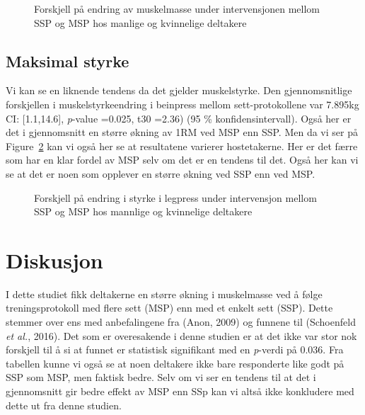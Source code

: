 \documentclass[
  letterpaper,
  DIV=11,
  numbers=noendperiod]{scrreprt}
\begin{document}
\begin{figure}


\caption{\label{fig-lean-body-mass}Forskjell på endring av muskelmasse
under intervensjonen mellom SSP og MSP hos manlige og kvinnelige
deltakere}

\end{figure}%

\subsection{Maksimal styrke}\label{maksimal-styrke}

Vi kan se en liknende tendens da det gjelder muskelstyrke. Den
gjennomsnitlige forskjellen i muskelstyrkeendring i beinpress mellom
sett-protokollene var 7.895kg CI: {[}1.1,14.6{]}, \emph{p}-value =0.025,
t30 =2.36) (95 \% konfidensintervall). Også her er det i gjennomsnitt en
større økning av 1RM ved MSP enn SSP. Men da vi ser på
Figure~\ref{fig-strength-test} kan vi også her se at resultatene
varierer hostetakerne. Her er det færre som har en klar fordel av MSP
selv om det er en tendens til det. Også her kan vi se at det er noen som
opplever en større økning ved SSP enn ved MSP.

\begin{figure}


\caption{\label{fig-strength-test}Forskjell på endring i styrke i
legpress under intervensjon mellom SSP og MSP hos mannlige og kvinnelige
deltakere}

\end{figure}%

\section{Diskusjon}\label{diskusjon-2}

I dette studiet fikk deltakerne en større økning i muskelmasse ved å
følge treningsprotokoll med flere sett (MSP) enn med et enkelt sett
(SSP). Dette stemmer over ens med anbefalingene fra (Anon, 2009) og
funnene til (Schoenfeld \emph{et al.}, 2016). Det som er overesakende i
denne studien er at det ikke var stor nok forskjell til å si at funnet
er statistisk signifikant med en \emph{p}-verdi på 0.036. Fra tabellen
kunne vi også se at noen deltakere ikke bare responderte like godt på
SSP som MSP, men faktisk bedre. Selv om vi ser en tendens til at det i
gjennomsnitt gir bedre effekt av MSP enn SSp kan vi altså ikke
konkludere med dette ut fra denne studien.
\end{document}
